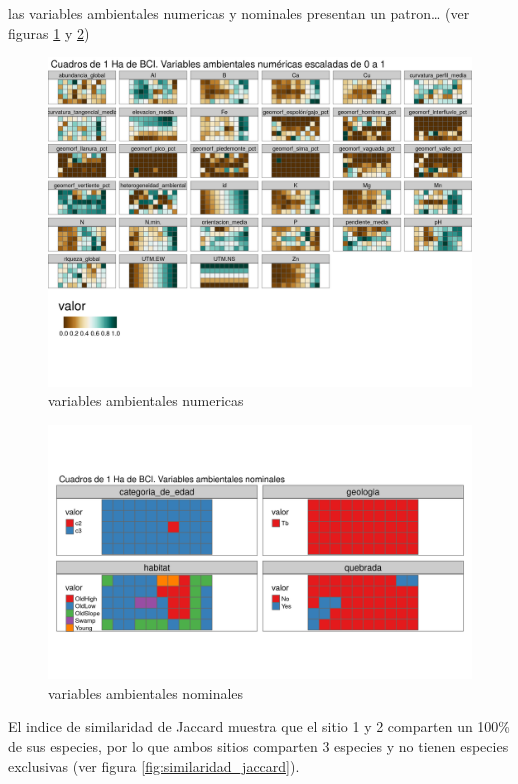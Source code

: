 \documentclass[11pt,]{article}
\begin{document}
las variables ambientales numericas y nominales presentan un
patron\ldots{} (ver figuras
\ref{fig:mapas_variables_ambientales_numericas} y
\ref{fig:mapas_variables_ambientales_nominales})

\begin{figure}
\centering
\includegraphics{mapas_variables_ambientales_numericas_tmap.png}
\caption{variables ambientales
numericas\label{fig:mapas_variables_ambientales_numericas}}
\end{figure}

\begin{figure}
\centering
\includegraphics{mapas_variables_ambientales_nominales_tmap.png}
\caption{variables ambientales
nominales\label{fig:mapas_variables_ambientales_nominales}}
\end{figure}

El indice de similaridad de Jaccard muestra que el sitio 1 y 2 comparten
un 100\% de sus especies, por lo que ambos sitios comparten 3 especies y
no tienen especies exclusivas (ver figura
\ref{fig:similaridad_jaccard}).
\end{document}
